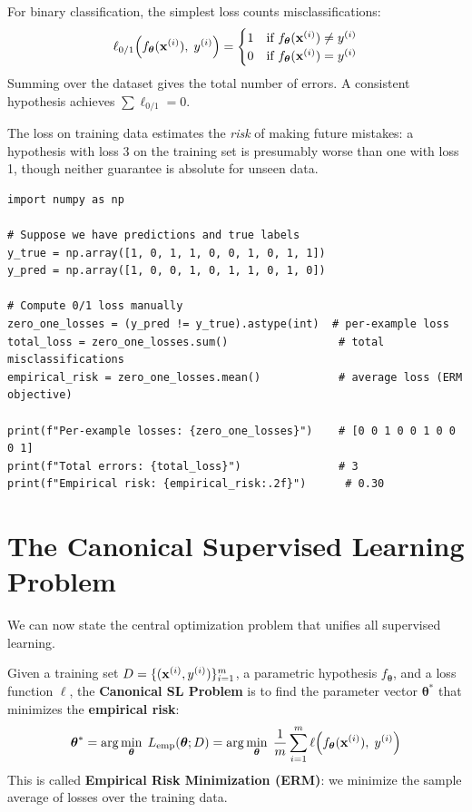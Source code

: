 \begin{definition}
For binary classification, the simplest loss counts misclassifications:
$$\ell_{0/1}\!\left(f_{\boldsymbol{\theta}}(\mathbf{x}^{(i)}),\; y^{(i)}\right) = \begin{cases} 1 & \text{if } f_{\boldsymbol{\theta}}(\mathbf{x}^{(i)}) \neq y^{(i)} \\ 0 & \text{if } f_{\boldsymbol{\theta}}(\mathbf{x}^{(i)}) = y^{(i)} \end{cases}$$
Summing over the dataset gives the total number of errors. A consistent hypothesis achieves $\sum \ell_{0/1} = 0$.
\end{definition}

The loss on training data estimates the \emph{risk} of making future mistakes: a hypothesis with loss 3 on the training set is presumably worse than one with loss 1, though neither guarantee is absolute for unseen data.

\begin{lstlisting}[style=pythonstyle]
import numpy as np

# Suppose we have predictions and true labels
y_true = np.array([1, 0, 1, 1, 0, 0, 1, 0, 1, 1])
y_pred = np.array([1, 0, 0, 1, 0, 1, 1, 0, 1, 0])

# Compute 0/1 loss manually
zero_one_losses = (y_pred != y_true).astype(int)  # per-example loss
total_loss = zero_one_losses.sum()                 # total misclassifications
empirical_risk = zero_one_losses.mean()            # average loss (ERM objective)

print(f"Per-example losses: {zero_one_losses}")    # [0 0 1 0 0 1 0 0 0 1]
print(f"Total errors: {total_loss}")               # 3
print(f"Empirical risk: {empirical_risk:.2f}")      # 0.30
\end{lstlisting}

\section*{The Canonical Supervised Learning Problem}

We can now state the central optimization problem that unifies all supervised learning.

\begin{definition}
Given a training set $D = \{(\mathbf{x}^{(i)}, y^{(i)})\}_{i=1}^m$, a parametric hypothesis $f_{\boldsymbol{\theta}}$, and a loss function $\ell$, the \textbf{Canonical SL Problem} is to find the parameter vector $\boldsymbol{\theta}^*$ that minimizes the \textbf{empirical risk}:
$$\boldsymbol{\theta}^* = \arg\min_{\boldsymbol{\theta}} \; L_{\text{emp}}(\boldsymbol{\theta}; D) = \arg\min_{\boldsymbol{\theta}} \; \frac{1}{m} \sum_{i=1}^{m} \ell\!\left(f_{\boldsymbol{\theta}}(\mathbf{x}^{(i)}),\; y^{(i)}\right)$$
This is called \textbf{Empirical Risk Minimization (ERM)}: we minimize the sample average of losses over the training data.
\end{definition}

